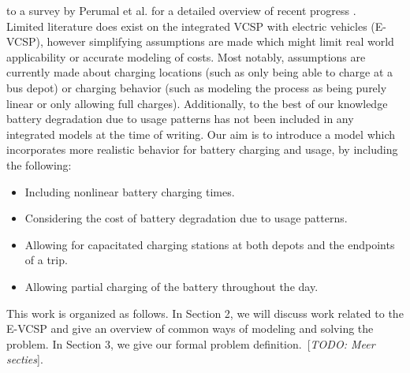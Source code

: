 \documentclass[]{article}
\newcommand{\todo}[1]{{\color{red}[\textit{TODO: #1}]}}
\begin{document}
to a survey by Perumal et al. for a detailed overview of recent progress
\citet{Perumal2022LitRev}. \\
Limited literature does exist on the integrated VCSP with electric vehicles (E-VCSP), however
simplifying assumptions are made which might limit real world applicability or
accurate modeling of costs. Most notably, assumptions are currently made about charging
locations (such as only being able to charge at a bus depot) or charging
behavior (such as modeling the process as being purely linear or only allowing
full charges). Additionally, to the best of our knowledge battery degradation
due to usage patterns has not been included in any integrated models at the
time of writing. Our aim is to introduce a model which incorporates more realistic behavior for battery charging and usage, by including the following:
\begin{itemize}
  \item Including nonlinear battery charging times.
  \item Considering the cost of battery degradation due to usage patterns.
  \item Allowing for capacitated charging stations at both depots and the endpoints of a trip.
  \item Allowing partial charging of the battery throughout the day.
\end{itemize}
This work is organized as follows. In Section 2, we will discuss work related to the E-VCSP and give an overview of common ways of modeling and solving the problem. In Section 3, we give our formal problem definition.\ \todo{Meer secties}.
\end{document}
